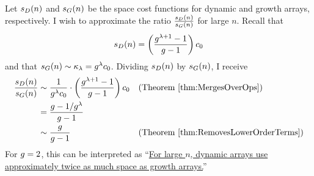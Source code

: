 Let $s_D(n)$ and $s_G(n)$ be the space cost functions for dynamic and growth arrays, respectively. I wish to approximate the ratio $\frac{s_D(n)}{s_G(n)}$ for large $n$. Recall that
\begin{align*}
s_D(n) = \left( \frac{g^{\lambda + 1} - 1}{g - 1} \right) c_0
\end{align*}
and that $s_G(n) \sim \kappa_\lambda = g^\lambda c_0$. Dividing $s_D(n)$ by $s_G(n)$, I receive
\begin{align*}
\frac{s_D(n)}{s_G(n)} &\sim \frac{1}{g^\lambda c_0} \cdot \left( \frac{g^{\lambda + 1} - 1}{g - 1} \right) c_0 &&\text{(Theorem \ref{thm:MergesOverOps})}\\
&= \frac{g - 1 / {g^\lambda}}{g - 1}\\
&\sim \frac{g}{g - 1} &&\text{(Theorem \ref{thm:RemovesLowerOrderTerms})}
\end{align*}
For $g = 2$, this can be interpreted as ``\underline{For large $n$, dynamic arrays use approximately twice as much space as growth arrays.}''